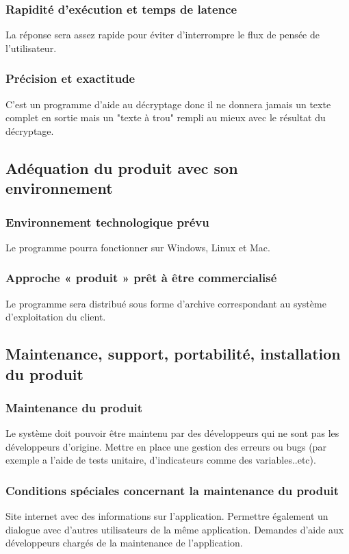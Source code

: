 \documentclass[a4]{article}
\begin{document}
			\subsubsection {Rapidité d’exécution et temps de latence}
				La réponse sera assez rapide pour éviter d’interrompre le flux de pensée de l’utilisateur.

			\subsubsection {Précision et exactitude}
				C'est un programme d'aide au décryptage donc il ne donnera jamais un texte complet en sortie 					mais un "texte à trou" rempli au mieux avec le résultat du décryptage.


		\subsection{Adéquation du produit avec son environnement}
			\subsubsection {Environnement technologique prévu}
				Le programme pourra fonctionner sur Windows, Linux et Mac.
			\subsubsection {Approche « produit » prêt à être commercialisé}
					Le programme sera distribué sous forme d'archive correspondant au système 						d'exploitation du client.
		\subsection{Maintenance, support, portabilité, installation du produit}
			\subsubsection {Maintenance du produit}
				Le système doit pouvoir être maintenu par des développeurs qui ne sont pas les
				développeurs d’origine.
				Mettre en place une gestion des erreurs ou bugs (par exemple a l'aide de tests unitaire, 				d'indicateurs comme des variables..etc).
			\subsubsection {Conditions spéciales concernant la maintenance du produit}
				Site internet avec des informations sur l'application.
				Permettre également un dialogue avec d'autres utilisateurs de la même application.
				Demandes d'aide aux développeurs chargés de la maintenance de l'application.
\end{document}
